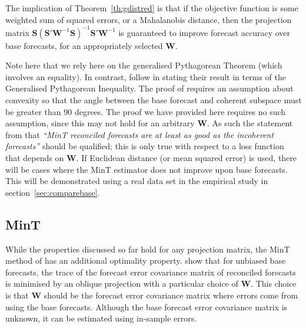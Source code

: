 \documentclass[12pt]{article}
\theoremstyle{definition}
\theoremstyle{property}
\begin{document}
	The implication of Theorem~\ref{th:gdistred} is that if the objective function is some weighted sum of squared errors, or a Mahalanobis distance, then the projection matrix $\bm{S}\left(\bm{S}'\bm{W}^{-1}\bm{S}\right)^{-1}\bm{S}'\bm{W}^{-1}$ is guaranteed to improve forecast accuracy over base forecasts, for an appropriately selected $\bm{W}$.
	
	Note here that we rely here on the generalised Pythagorean Theorem (which involves an equality).  In contrast, \cite{WicEtAl2019} follow \cite{VanErven2015a} in stating their result in terms of the Generalised Pythagorean Inequality.  The proof of \cite{WicEtAl2019} requires an assumption about convexity so that the angle between the base forecast and coherent subspace must be greater than 90 degrees.  The proof we have provided here requires no such assumption, since this may not hold for an arbitrary $\bm{W}$.  As such the statement from \cite{WicEtAl2019} that {\em``MinT reconciled forecasts are at least as good as the incoherent forecasts''} should be qualified; this is only true with respect to a loss function that depends on ${\bm W}$.  If Euclidean distance (or mean squared error) is used, there will be cases where the MinT estimator does not improve upon base forecasts.  This will be demonstrated using a real data set in the empirical study in section~\ref{sec:comparebase}.
	
	
	\subsection{MinT}
	
	While the properties discussed so far hold for any projection matrix, the MinT method of \cite{WicEtAl2019} has an additional optimality property.  \cite{WicEtAl2019} show that for unbiased base forecasts, the trace of the forecast error covariance matrix of reconciled forecasts is minimised by an oblique projection with a particular choice of $\bm{W}$.  This choice is that $\bm{W}$ should be the forecast error covariance matrix where errors come from using the base forecasts.  Although the base forecast error covariance matrix is unknown, it can be estimated using in-sample errors.
	
\end{document}
